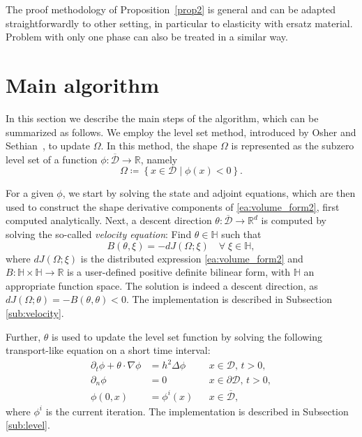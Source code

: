 \documentclass[preprint,9pt]{elsarticle}
\begin{document}
The proof methodology of Proposition~\ref{prop2} is general and can be adapted straightforwardly to other setting, in particular to elasticity with ersatz material.
Problem with only one phase can also be treated in a similar way.









\section{Main algorithm}\label{sec:algo}

In this section we describe the main steps of the algorithm,
which can be summarized as follows. 
We employ the level set method, introduced by
Osher and Sethian~\cite{MR965860}, to update $\Omega$. 
In this method, the shape $\Omega$ is represented as
the subzero level set of a function
$\phi\colon\overline{\mathcal{D}}\to\mathds{R}$, namely
\begin{equation}\label{eq:subdomain}
	\Omega\coloneqq\left\{x\in\mathcal{D}\mid\phi(x)<0\right\}.
\end{equation}

For a given $\phi$, we start by solving the state and adjoint equations,
which are then used to construct the shape derivative components
of \eqref{ea:volume_form2}, first computed analytically.
Next, a descent direction $\theta\colon\overline{\mathcal{D}}\to\mathds{R}^d$
is computed by solving the so-called {\it velocity equation}:
Find $\theta\in\mathbb{H}$ such that
\begin{equation}\label{eq:velocity_eq0} 
	B(\theta,\xi)=-dJ(\Omega;\xi)
	\quad\forall\;\xi\in\mathbb{H},
\end{equation}	
where $dJ(\Omega;\xi)$ is the distributed expression \eqref{ea:volume_form2}
and $B:\mathbb{H}\times\mathbb{H}\to\mathds{R}$ is a user-defined
positive definite bilinear form,
with $\mathbb{H}$ an appropriate function space.
The solution is indeed a descent direction, as
$dJ(\Omega;\theta)=-B(\theta,\theta)<0$.
The implementation is described in Subsection \ref{sub:velocity}.

Further, $\theta$ is used to update the level set function
by solving the following transport-like equation on a short time interval:
\begin{equation} \label{eq:transport0}
	\begin{aligned}
	\partial_t \phi+\theta\cdot\nabla\phi
		&= h^2\Delta\phi && x\in \mathcal{D},\, t>0, \\
	\partial_{n}\phi
		&= 0 && x\in \partial\mathcal{D},\, t>0, \\
	\phi(0, x)
		&= \phi^{i}(x) && x\in \overline{\mathcal{D}},
	\end{aligned}
\end{equation}
where $\phi^{i}$ is the current iteration.
The implementation is described in Subsection \ref{sub:level}.
\end{document}
